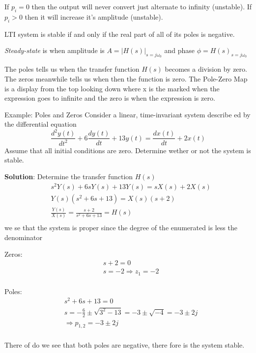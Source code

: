 \documentclass{article}
\begin{document}
If $p_i=0$ then the output will never convert just alternate to infinity (unstable). \newline
\indent If $p_i>0$ then it will increase it's amplitude (unstable). \newline

LTI system is stable if and only if the real part of all of its poles is negative. \newline

\textit{Steady-state} is when amplitude is $A=|H(s)|_{s=j\omega_0}$ and phase $\phi=H(s)_{s=j\omega_0}$ \newline

The poles tells us when the transfer function $H(s)$ becomes a division by zero. 
The zeros meanwhile tells us when then the function is zero. The Pole-Zero Map 
is a display from the top looking down where x is the marked when the expression goes to infinite and
the zero is when the expression is zero.

\begin{exampleblock}{Example: Poles and Zeros}%
Consider a linear, time-invariant system describe ed by the differential equation
\begin{equation*}
    \frac{d^2y(t)}{dt^2} + 6\frac{dy(t)}{dt} + 13y(t) = \frac{dx(t)}{dt} + 2x(t)
\end{equation*}
Assume that all initial conditions are zero.
Determine wether or not the system is stable.

\textbf{Solution}:
Determine the transfer function $H(s)$
\begin{align*}
    &s^2Y(s) +6sY(s) + 13Y(s) = sX(s) + 2X(s) \\
    &Y(s)(s^2+6s+13) = X(s)(s+2) \\
    &\frac{Y(s)}{X(s)} = \frac{s+2}{s^2+6s+13} = H(s) \\
\end{align*}
we se that the system is proper since the degree of the enumerated is less the denominator

Zeros:
\begin{align*}
    &s+2=0 \\
    &s=-2 \Rightarrow z_1=-2 \\
\end{align*}

Poles:
\begin{align*}
    &s^2+6s+13 = 0 \\
    &s=-\frac{6}{2}\pm\sqrt{3^2-13}=-3\pm\sqrt{-4}=-3\pm 2j \\
    &\Rightarrow p_{1,2} = -3\pm 2j \\
\end{align*}

There of do we see that both poles are negative, there fore is the system stable.
\end{exampleblock}
\end{document}
